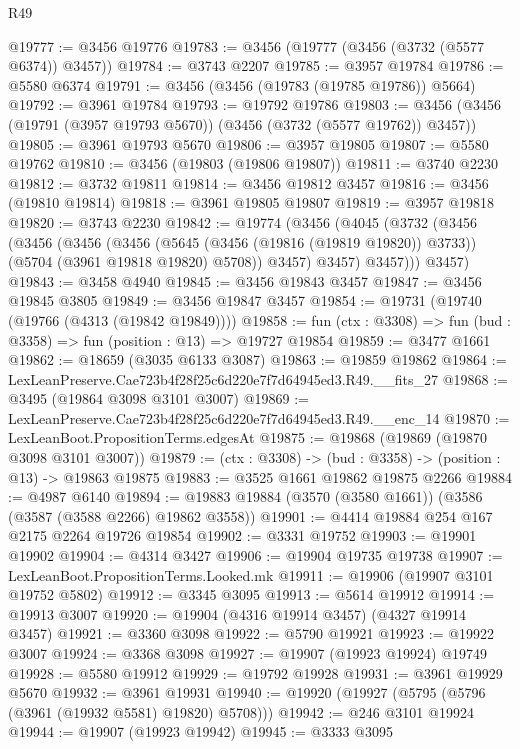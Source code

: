 \begin{lexlean}{R49}
\begin{coremodule}
@19777 := @3456 @19776
@19783 := @3456 (@19777 (@3456 (@3732 (@5577 @6374)) @3457))
@19784 := @3743 @2207
@19785 := @3957 @19784
@19786 := @5580 @6374
@19791 := @3456 (@3456 (@19783 (@19785 @19786)) @5664)
@19792 := @3961 @19784
@19793 := @19792 @19786
@19803 := @3456 (@3456 (@19791 (@3957 @19793 @5670)) (@3456 (@3732 (@5577 @19762)) @3457))
@19805 := @3961 @19793 @5670
@19806 := @3957 @19805
@19807 := @5580 @19762
@19810 := @3456 (@19803 (@19806 @19807))
@19811 := @3740 @2230
@19812 := @3732 @19811
@19814 := @3456 @19812 @3457
@19816 := @3456 (@19810 @19814)
@19818 := @3961 @19805 @19807
@19819 := @3957 @19818
@19820 := @3743 @2230
@19842 := @19774
    (@3456
      (@4045
        (@3732
          (@3456
            (@3456
              (@3456
                (@3456
                  (@5645 (@3456 (@19816 (@19819 @19820)) @3733))
                  (@5704 (@3961 @19818 @19820) @5708))
                @3457)
              @3457)
            @3457)))
      @3457)
@19843 := @3458 @4940
@19845 := @3456 @19843 @3457
@19847 := @3456 @19845 @3805
@19849 := @3456 @19847 @3457
@19854 := @19731 (@19740 (@19766 (@4313 (@19842 @19849))))
@19858 := fun (ctx : @3308) => fun (bud : @3358) => fun (position : @13) => @19727 @19854
@19859 := @3477 @1661
@19862 := @18659 (@3035 @6133 @3087)
@19863 := @19859 @19862
@19864 := LexLeanPreserve.Cae723b4f28f25c6d220e7f7d64945ed3.R49.__fits_27
@19868 := @3495 (@19864 @3098 @3101 @3007)
@19869 := LexLeanPreserve.Cae723b4f28f25c6d220e7f7d64945ed3.R49.__enc_14
@19870 := LexLeanBoot.PropositionTerms.edgesAt
@19875 := @19868 (@19869 (@19870 @3098 @3101 @3007))
@19879 := (ctx : @3308) -> (bud : @3358) -> (position : @13) -> @19863 @19875
@19883 := @3525 @1661 @19862 @19875 @2266
@19884 := @4987 @6140
@19894 := @19883 @19884 (@3570 (@3580 @1661)) (@3586 (@3587 (@3588 @2266) @19862 @3558))
@19901 := @4414 @19884 @254 @167 @2175 @2264 @19726 @19854
@19902 := @3331 @19752
@19903 := @19901 @19902
@19904 := @4314 @3427
@19906 := @19904 @19735 @19738
@19907 := LexLeanBoot.PropositionTerms.Looked.mk
@19911 := @19906 (@19907 @3101 @19752 @5802)
@19912 := @3345 @3095
@19913 := @5614 @19912
@19914 := @19913 @3007
@19920 := @19904 (@4316 @19914 @3457) (@4327 @19914 @3457)
@19921 := @3360 @3098
@19922 := @5790 @19921
@19923 := @19922 @3007
@19924 := @3368 @3098
@19927 := @19907 (@19923 @19924) @19749
@19928 := @5580 @19912
@19929 := @19792 @19928
@19931 := @3961 @19929 @5670
@19932 := @3961 @19931
@19940 := @19920 (@19927 (@5795 (@5796 (@3961 (@19932 @5581) @19820) @5708)))
@19942 := @246 @3101 @19924
@19944 := @19907 (@19923 @19942)
@19945 := @3333 @3095

\end{coremodule}
\end{lexlean}
